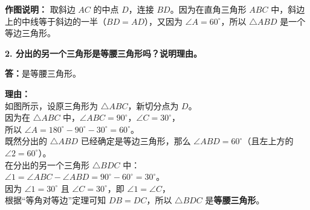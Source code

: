 \begin{center}
\end{center}

\vspace{0.4cm}

{\small\color{gray}
\textbf{作图说明：} 取斜边 $AC$ 的中点 $D$，连接 $BD$。因为在直角三角形 $ABC$ 中，斜边上的中线等于斜边的一半（$BD = AD$），又因为 $\angle A = 60^\circ$，所以 $\triangle ABD$ 是一个等边三角形。
}

\vspace{0.8cm}

\noindent\textbf{2. 分出的另一个三角形是等腰三角形吗？说明理由。}

\vspace{0.4cm}

\noindent
\textbf{答：}是等腰三角形。

\vspace{0.4cm}

\noindent
\textbf{理由：}\\
如图所示，设原三角形为 $\triangle ABC$，新切分点为 $D$。\\
因为在 $\triangle ABC$ 中，$\angle ABC = 90^\circ$，$\angle C = 30^\circ$，\\
所以 $\angle A = 180^\circ - 90^\circ - 30^\circ = 60^\circ$。\\
既然分出的 $\triangle ABD$ 已经确定是等边三角形，那么 $\angle ABD = 60^\circ$（且左上方的 $\angle 2 = 60^\circ$）。\\
在分出的另一个三角形 $\triangle BDC$ 中：\\
$\angle 1 = \angle ABC - \angle ABD = 90^\circ - 60^\circ = 30^\circ$。\\
因为 $\angle 1 = 30^\circ$ 且 $\angle C = 30^\circ$，即 $\angle 1 = \angle C$，\\
根据“等角对等边”定理可知 $DB = DC$，所以 $\triangle BDC$ 是\textbf{等腰三角形}。

